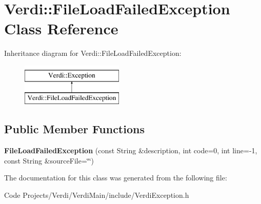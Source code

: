 \hypertarget{class_verdi_1_1_file_load_failed_exception}{\section{\-Verdi\-:\-:\-File\-Load\-Failed\-Exception \-Class \-Reference}
\label{class_verdi_1_1_file_load_failed_exception}
}
\-Inheritance diagram for \-Verdi\-:\-:\-File\-Load\-Failed\-Exception\-:\begin{figure}[H]
\begin{center}
\leavevmode
\includegraphics[height=2.000000cm]{class_verdi_1_1_file_load_failed_exception}
\end{center}
\end{figure}
\subsection*{\-Public \-Member \-Functions}
\begin{DoxyCompactItemize}
\item 
\hypertarget{class_verdi_1_1_file_load_failed_exception_a8a8f34d85d4bb13fa45919eb7944e410}{{\bfseries \-File\-Load\-Failed\-Exception} (const \-String \&description, int code=0, int line=-\/1, const \-String \&source\-File=\char`\"{}\char`\"{})}\label{class_verdi_1_1_file_load_failed_exception_a8a8f34d85d4bb13fa45919eb7944e410}

\end{DoxyCompactItemize}


\-The documentation for this class was generated from the following file\-:\begin{DoxyCompactItemize}
\item 
\-Code Projects/\-Verdi/\-Verdi\-Main/include/\-Verdi\-Exception.\-h\end{DoxyCompactItemize}
